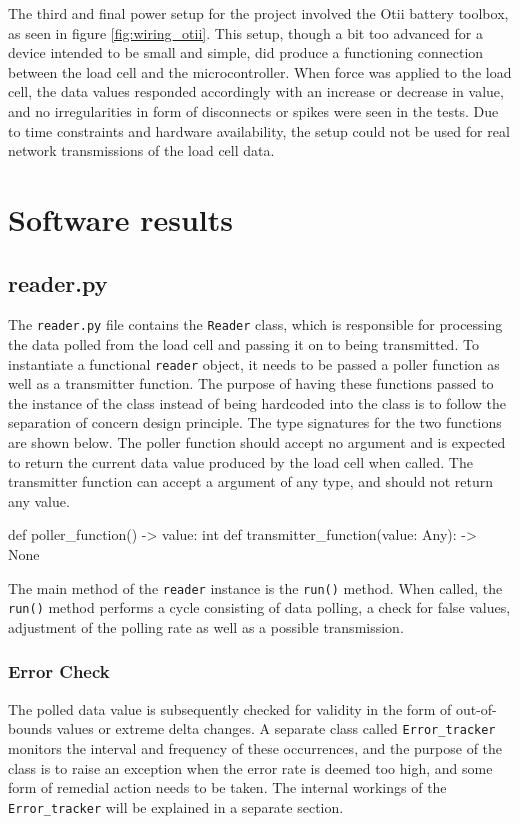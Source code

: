 The third and final power setup for the project involved the Otii battery toolbox, as seen in figure \ref{fig:wiring_otii}. This setup, though a bit too advanced for a device intended to be small and simple, did produce a functioning connection between the load cell and the microcontroller. When force was applied to the load cell, the data values responded accordingly with an increase or decrease in value, and no irregularities in form of disconnects or spikes were seen in the tests. Due to time constraints and hardware availability, the setup could not be used for real network transmissions of the load cell data.

\section{Software results}

\subsection{reader.py}
The \lstinline{reader.py} file contains the \lstinline{Reader} class, which is responsible for processing the data polled from the load cell and passing it on to being transmitted. To instantiate a functional \lstinline{reader} object, it needs to be passed a poller function as well as a transmitter function. The purpose of having these functions passed to the instance of the class instead of being hardcoded into the class is to follow the separation of concern design principle.\cite{sep-concern} The type signatures for the two functions are shown below. The poller function should accept no argument and is expected to return the current data value produced by the load cell when called. The transmitter function can accept a argument of any type, and should not return any value.
\begin{Code}
	def poller_function() -> value: int
	def transmitter_function(value: Any): -> None
\end{Code}


The main method of the \lstinline{reader} instance is the \lstinline{run()} method. When called, the \lstinline{run()} method performs a cycle consisting of data polling, a check for false values, adjustment of the polling rate as well as a possible transmission. 

\subsubsection{Error Check}
The polled data value is subsequently checked for validity in the form of out-of-bounds values or extreme delta changes. A separate class called \lstinline{Error_tracker} monitors the interval and frequency of these occurrences, and the purpose of the class is to raise an exception when the error rate is deemed too high, and some form of remedial action needs to be taken. The internal workings of the \lstinline{Error_tracker} will be explained in a separate section.

